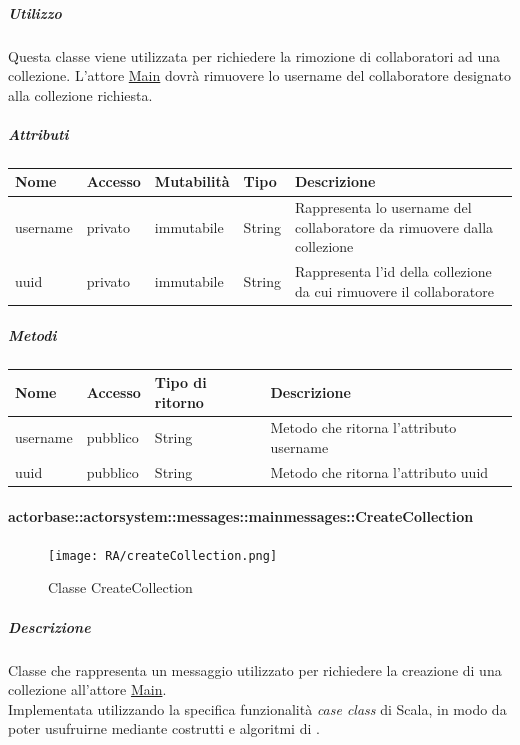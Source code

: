 \documentclass{scalatekids-article}
\begin{document}
\subparagraph{Utilizzo}
Questa classe viene utilizzata per richiedere la rimozione di collaboratori ad
una collezione. L'attore
\hyperref[sec:actorbase::actorsystem::actors::main::Main]{Main} dovrà rimuovere
lo username del collaboratore designato alla collezione richiesta.

\subparagraph{Attributi}
\begin{tabular}{| p{2cm} | p{1.5cm} | p{2cm} | p{3cm} | p{8.5cm} |}
  \hline
  Nome & Accesso & Mutabilità & Tipo & Descrizione\\
  \hline
  username & privato & immutabile & String & Rappresenta lo username del collaboratore da rimuovere dalla collezione\\
  \hline
  uuid & privato & immutabile & String & Rappresenta l'id della collezione da cui rimuovere il collaboratore\\
  \hline
\end{tabular}

\subparagraph{Metodi}
\begin{tabular}{| p{3cm} | p{1.5cm} | p{3.5cm} | p{9cm} |}
  \hline
  Nome & Accesso & Tipo di ritorno & Descrizione\\
  \hline
  username & pubblico & String & Metodo che ritorna l'attributo username\\
  \hline
  uuid & pubblico & String & Metodo che ritorna l'attributo uuid\\
  \hline
\end{tabular}

\paragraph{actorbase::actorsystem::messages::mainmessages::CreateCollection}
\label{sec:actorbase::actorsystem::messages::mainmessages::CreateCollection}

\begin{figure}[H]
  \begin{center}
    \texttt{[image: RA/createCollection.png]}
    \caption{Classe CreateCollection}
  \end{center}
\end{figure}

\subparagraph{Descrizione}
Classe che rappresenta un messaggio utilizzato per richiedere la creazione di una collezione all'attore \hyperref[sec:actorbase::actorsystem::actors::main::Main]{Main}.\\Implementata
utilizzando la specifica funzionalità \textit{case class} di Scala, in modo da poter usufruirne mediante costrutti e algoritmi di
.
\end{document}
